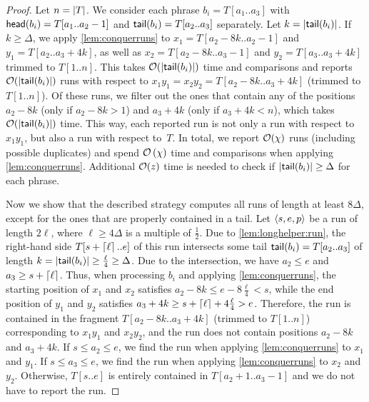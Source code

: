 \begin{proof}
\newcommand{\targettime}{\Sigma_{\textsf{target}}}
Let $n = \left\lvert T\right\rvert$. We consider each phrase $b_i = T[a_1..a_3]$ with $\textsf{head}(b_i) = T[a_1..a_2 - 1]$ and $\textsf{tail}(b_i) = T[a_2..a_3]$ separately. Let $k = \left\lvert\textsf{tail}(b_i)\right\rvert$. 
If $k \geq \Delta$, we apply \cref{lem:conquerruns} to $x_1 = T[a_2 - 8k..a_2 - 1]$ and $y_1 = T[a_2..a_3 + 4k]$, as well as $x_2 = T[a_2 - 8k..a_3 - 1]$ and $y_2 = T[a_3..a_3 + 4k]$ trimmed to $T[1..n]$. This takes $\mathcal{O}(\left\lvert\textsf{tail}(b_i)\right\rvert)$ time and comparisons and reports $\mathcal{O}(\left\lvert\textsf{tail}(b_i)\right\rvert)$ runs with respect to $x_1y_1=x_2y_2=T[a_2 - 8k..a_3 + 4k]$ (trimmed to $T[1..n]$). 
Of these runs, we filter out the ones that contain any of the positions $a_2 - 8k$ (only if $a_2 - 8k > 1$) and $a_3 + 4k$ (only if $a_3 + 4k < n$), which takes $\mathcal{O}(\left\lvert\textsf{tail}(b_i)\right\rvert)$ time.
This way, each reported run is not only a run with respect to $x_1y_1$, but also a run with respect to~$T$.
In total, we report $\mathcal{O}(\chi)$ runs (including possible duplicates) and spend $\mathcal{O}\left(\chi\right)$ time and comparisons when applying \cref{lem:conquerruns}. Additional $\mathcal{O}(z)$ time is needed to check if $\left\lvert\textsf{tail}(b_i)\right\rvert \geq \Delta$ for each phrase.

Now we show that the described strategy computes all runs of length at least $8\Delta$, except for the ones that are properly contained in a tail. Let $\left\langle s,e,p\right\rangle$ be a run of length $2\ell$, where $\ell \geq 4\Delta$ is a multiple of $\frac 1 2$.
Due to \cref{lem:longhelper:run}, the right-hand side $T[s+\left\lceil\ell\right\rceil..e]$ of this run intersects some tail $\textsf{tail}(b_i) = T[a_2..a_3]$ of length $k = \left\lvert\textsf{tail}(b_i)\right\rvert \geq \frac \ell 4 \geq \Delta$.
Due to the intersection, we have $a_2 \leq e$ and $a_3 \geq s + \left\lceil\ell\right\rceil$.
Thus, when processing $b_i$ and applying \cref{lem:conquerruns}, the starting position of $x_1$ and $x_2$ satisfies $a_2 - 8k \leq e - 8\frac \ell 4 < s$, while the end position of $y_1$ and $y_2$ satisfies $a_3 + 4k \geq s + \left\lceil\ell\right\rceil + 4\frac \ell 4 > e$. 
Therefore, the run is contained in the fragment $T[a_2 - 8k..a_3 + 4k]$ (trimmed to $T[1..n]$) corresponding to $x_1y_1$ and $x_2y_2$, and the run does not contain positions $a_2 - 8k$ and $a_3 + 4k$.
If $s \leq a_2 \leq e$, we find the run when applying \cref{lem:conquerruns} to $x_1$ and $y_1$.
If $s \leq a_3 \leq e$, we find the run when applying \cref{lem:conquerruns} to $x_2$ and $y_2$.
Otherwise, $T[s..e]$ is entirely contained in $T[a_2 + 1..a_3 - 1]$ and we do not have to report the run.
\end{proof}


